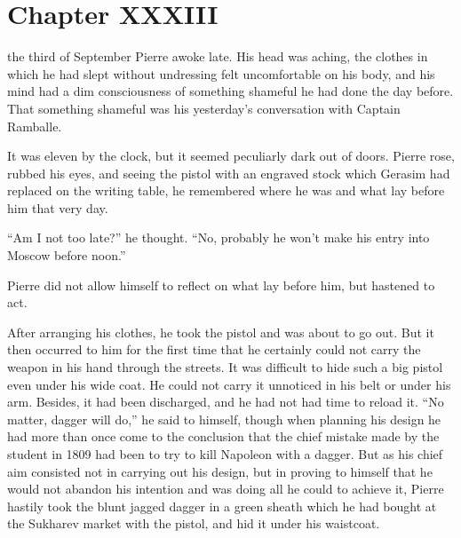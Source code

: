 
\chapter*{Chapter XXXIII} \ifaudio {}
\fi

 the third of September Pierre awoke late. His head was aching,
the clothes in which he had slept without undressing felt
uncomfortable on his body, and his mind had a dim consciousness
of something shameful he had done the day before. That something
shameful was his yesterday's conversation with Captain Ramballe.

It was eleven by the clock, but it seemed peculiarly dark out of
doors.  Pierre rose, rubbed his eyes, and seeing the pistol with
an engraved stock which Gerasim had replaced on the writing
table, he remembered where he was and what lay before him that
very day.

``Am I not too late?'' he thought. ``No, probably he won't make
his entry into Moscow before noon.''

Pierre did not allow himself to reflect on what lay before him,
but hastened to act.

After arranging his clothes, he took the pistol and was about to
go out.  But it then occurred to him for the first time that he
certainly could not carry the weapon in his hand through the
streets. It was difficult to hide such a big pistol even under
his wide coat. He could not carry it unnoticed in his belt or
under his arm. Besides, it had been discharged, and he had not
had time to reload it. ``No matter, dagger will do,'' he said to
himself, though when planning his design he had more than once
come to the conclusion that the chief mistake made by the student
in 1809 had been to try to kill Napoleon with a dagger. But as
his chief aim consisted not in carrying out his design, but in
proving to himself that he would not abandon his intention and
was doing all he could to achieve it, Pierre hastily took the
blunt jagged dagger in a green sheath which he had bought at the
Sukharev market with the pistol, and hid it under his waistcoat.

